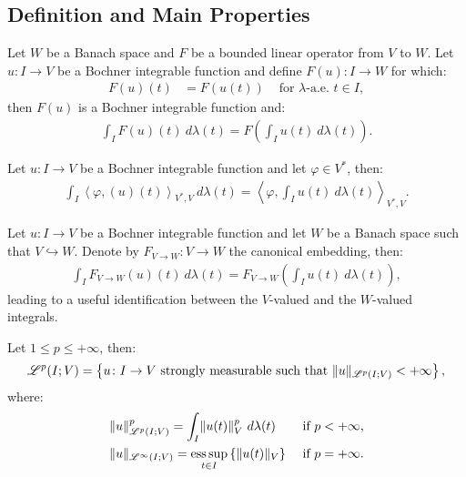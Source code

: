 \newpage
\subsection{Definition and Main Properties}

\begin{corollary}
    Let $W$ be a Banach space and $F$ be a bounded linear operator from $V$ to $W$. Let $u\colon I \rightarrow V$ be a Bochner integrable function and define $F(u) \colon I \rightarrow W$ for which:
    \begin{align}
        F(u)(t) &= F(u(t)) &\text{ for } \lambda \text{-a.e. } t \in I,
    \end{align}
    then $F(u)$ is a Bochner integrable function and:
    \begin{align}
        \int_I F(u)(t) ~ d \lambda(t) = F\left( \int_I u(t) ~ d \lambda(t) \right).
    \end{align}
\end{corollary}

\begin{remark} %
    Let $u\colon I \rightarrow V$ be a Bochner integrable function and let $\varphi \in V^*$, then:
    \begin{align}
        \int_I \left\langle \varphi, (u)(t) \right\rangle_{V^*, V} ~ d \lambda(t) = \left\langle \varphi, \int_I u(t) ~ d \lambda(t) \right\rangle_{V^*, V}.
    \end{align}
\end{remark}

\begin{remark}[Embedding]
    Let $u\colon I \rightarrow V$ be a Bochner integrable function and let $W$ be a Banach space such that $V \hookrightarrow W$. Denote by $F_{V \rightarrow W} \colon V \rightarrow W$ the canonical embedding, then:
    \begin{align}
        \int_I F_{V \rightarrow W}(u)(t) ~ d \lambda(t) = F_{V \rightarrow W}\left( \int_I u(t) ~ d \lambda(t) \right),
    \end{align}
    leading to a useful identification between the $V$-valued and the $W$-valued integrals.
\end{remark}

\begin{definition}[$\SpaceLp{p}(I; V)$]
    Let $1 \leq p \leq +\infty$, then:
    \begin{align}
        \mathscr{L}^{p}(I; V) = \left\{ u \colon I \rightarrow V \text{ strongly measurable such that } \lVert u \rVert_{\mathscr{L}^{p}(I; V)} < +\infty \right\},
    \end{align}
    where:
    \begin{align}
        & \lVert u \rVert_{\mathscr{L}^{p}(I; V)}^p = \int_I \lVert u(t) \rVert_V^p ~ d \lambda(t) & \text{ if } p < +\infty, \\
        & \lVert u \rVert_{\mathscr{L}^{\infty}(I; V)} = \operatorname*{ess\,sup}_{t \in I} \left\{ \lVert u(t) \rVert_V \right\} & \text{ if } p = +\infty.
    \end{align}
\end{definition}

